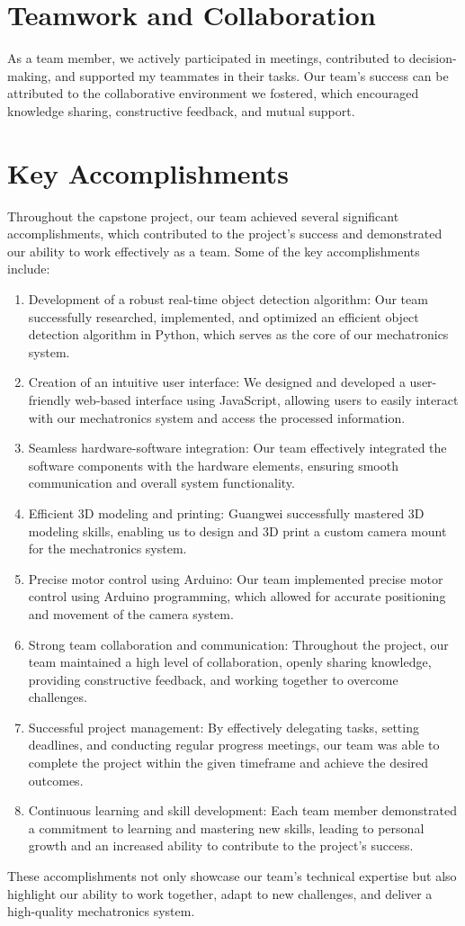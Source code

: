 \documentclass{article}
\begin{document}
\section{Teamwork and Collaboration}
As a team member, we actively participated in meetings, contributed to decision-making, and supported my teammates in their tasks. Our team's success can be attributed to the collaborative environment we fostered, which encouraged knowledge sharing, constructive feedback, and mutual support.
\section{Key Accomplishments}
Throughout the capstone project, our team achieved several significant accomplishments, which contributed to the project's success and demonstrated our ability to work effectively as a team. Some of the key accomplishments include:
\begin{enumerate}
    \item Development of a robust real-time object detection algorithm: Our team successfully researched, implemented, and optimized an efficient object detection algorithm in Python, which serves as the core of our mechatronics system.
    \item Creation of an intuitive user interface: We designed and developed a user-friendly web-based interface using JavaScript, allowing users to easily interact with our mechatronics system and access the processed information.
    \item Seamless hardware-software integration: Our team effectively integrated the software components with the hardware elements, ensuring smooth communication and overall system functionality.
    \item Efficient 3D modeling and printing: Guangwei successfully mastered 3D modeling skills, enabling us to design and 3D print a custom camera mount for the mechatronics system.
    \item Precise motor control using Arduino: Our team implemented precise motor control using Arduino programming, which allowed for accurate positioning and movement of the camera system.
    \item Strong team collaboration and communication: Throughout the project, our team maintained a high level of collaboration, openly sharing knowledge, providing constructive feedback, and working together to overcome challenges.
    \item Successful project management: By effectively delegating tasks, setting deadlines, and conducting regular progress meetings, our team was able to complete the project within the given timeframe and achieve the desired outcomes.
    \item Continuous learning and skill development: Each team member demonstrated a commitment to learning and mastering new skills, leading to personal growth and an increased ability to contribute to the project's success.
\end{enumerate}
These accomplishments not only showcase our team's technical expertise but also highlight our ability to work together, adapt to new challenges, and deliver a high-quality mechatronics system.
\end{document}

